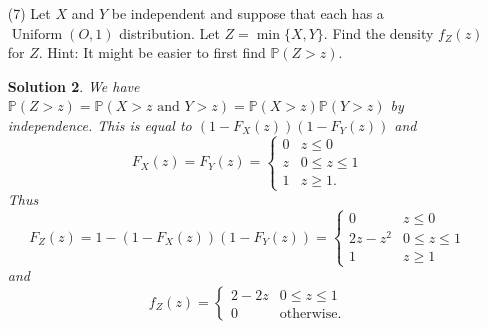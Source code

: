 \documentclass[10pt]{article}
\newtheorem*{sol}{Solution}
\renewcommand{\P}{\mathbb{P}}
\newcommand{\Unif}{\operatorname{Uniform}}
\begin{document}
\begin{enumerate}
\begin{sol}
\begin{enumerate}[(a)]
\item We will compute $F_Y(y)$ and take its derivative to compute $f_Y(y)$.
We want to calculate $F_Y(y)=\P(Y\leq y)=\P(1/X \leq y)$. This is 0 if $y\leq 0$
so we may assume without loss of generality that $y>0$.
We consider the set $A_y=\{x>0:1/x\leq y\}$. This is equal to $[1/y,\infty)$,
so $F_Y(y)=\int_{1/y}^\infty f_X(x)dx$.

First consider the case $1/y \geq 5$ i.e. $y\leq 1/5$. Then we have
\[
F_Y(y) = \int_{1/y}^\infty f_X(x)dx \leq \int_5^\infty f_X(x)dx=0.
\]
Now consider the case $3\leq 1/y\leq 5$ i.e. $1/5\leq y\leq 1/3$.
Since $1/y \geq 3$ we have
\[
F_Y(y) =  \int_{1/y}^5 \frac{3}{8} dx
=\frac{3}{8}(5-1/y).
\]
Now consider the case $1\leq 1/y\leq 3$ i.e. $1/3\leq y\leq 1$.
Since $1/y \geq 1$ we have
\[
F_Y(y) = \int_{1/y}^\infty f_X(x)dx = \int_3^5 \frac{3}{8} dx=\frac{3}{4}.
\]
Finally if $0<1/y\leq 1$, i.e. $1\leq y$, we have
\[
F_Y(y) = \int_{1/y}^1 f_X(x) dx + \frac{3}{4}
= \frac{1}{4}(1-1/y) + \frac{3}{4}.
\]
\end{enumerate}

Thus,
\[
F_Y(y) =
\begin{cases}
0 & y\leq 1/5 \\
\frac{3}{8}(5-\frac{1}{y}) &  1/5 \leq y\leq 1/3 \\
\frac{3}{4} & 1/3 \leq y \leq 1 \\
\frac{3}{4} + \frac{1}{4}(1-\frac{1}{y}) & y\geq 1
\end{cases}
\]
and
\[
f_Y(g) =
\begin{cases}
0 & y\leq 1/5 \\
\frac{3}{8y^2} &  1/5 \leq y\leq 1/3 \\
0 & 1/3 \leq y \leq 1 \\
\frac{1}{4y^2} & y\geq 1.
\end{cases}
\]
\end{sol}

\item[(7)] Let $X$ and $Y$ be independent and suppose that each has a
$\Unif(O, 1)$ distribution. Let $Z = \min\{X, Y\}$.
Find the density $f_Z(z)$ for $Z$. Hint:
It might be easier to first find $\P(Z>z)$.

\begin{sol}
We have $\P(Z>z) = \P(X>z \text{ and } Y>z)=\P(X>z)\P(Y>z)$ by independence.
This is equal to $(1-F_X(z))(1-F_Y(z))$ and
\[
F_X(z)=F_Y(z) =
\begin{cases}
0 & z\leq 0 \\
z & 0\leq z \leq 1\\
1 & z\geq 1.
\end{cases}
\]
Thus \[
F_Z(z) = 1-(1-F_X(z))(1-F_Y(z)) =
\begin{cases}
0 & z\leq 0 \\
2z-z^2 & 0\leq z \leq 1\\
1 & z\geq 1
\end{cases}
\]
and
\[
f_Z(z) =
\begin{cases}
2 - 2z & 0\leq z \leq 1\\
0 & \text{otherwise}.
\end{cases}
\]
\end{sol}


\end{enumerate}
\end{document}
